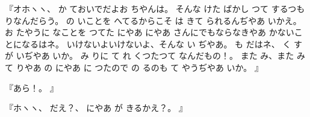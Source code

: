 『オホヽヽ、
か
ておいでだよお
ちやんは。
そんな
けた
ばかし
つて
するつもりなんだらう。
の
いことを
へてるからこそ
は
きて
られるんぢやあ
いかえ。
お
たやうに
なことを
つてた
にやあ
にやあ
さんにでもならなきやあ
かないことになるはネ。
いけないよいけないよ、そんな
い
ぢやあ。
も
だはネ、
く
すが
いぢやあ
いか。
み
りに
て
れ
くつたつて
なんだもの！。
また
み、また
み
て
りやあ
の
にやあ
に
つたので
の
るのも
て
やうぢやあ
いか。
』

『あら！。
』

『ホヽヽ、
だえ？、
にやあ
が
きるかえ？。
』

